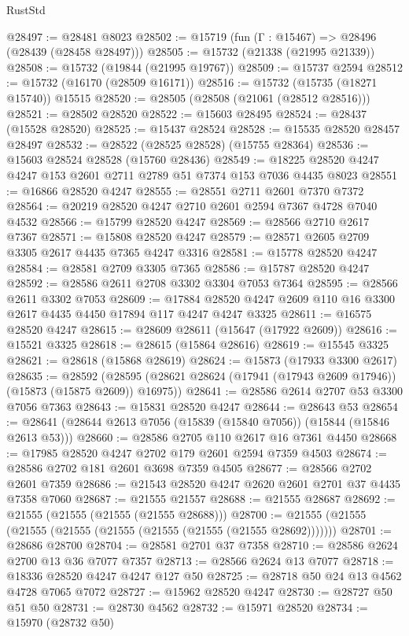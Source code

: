 \begin{lexlean}{RustStd}
\begin{coremodule}
@28497 := @28481 @8023
@28502 := @15719 (fun (Γ : @15467) => @28496 (@28439 (@28458 @28497)))
@28505 := @15732 (@21338 (@21995 @21339))
@28508 := @15732 (@19844 (@21995 @19767))
@28509 := @15737 @2594
@28512 := @15732 (@16170 (@28509 @16171))
@28516 := @15732 (@15735 (@18271 @15740)) @15515
@28520 := @28505 (@28508 (@21061 (@28512 @28516)))
@28521 := @28502 @28520
@28522 := @15603 @28495
@28524 := @28437 (@15528 @28520)
@28525 := @15437 @28524
@28528 := @15535 @28520 @28457 @28497
@28532 := @28522 (@28525 @28528) (@15755 @28364)
@28536 := @15603 @28524 @28528 (@15760 @28436)
@28549 := @18225 @28520 @4247 @4247 @153 @2601 @2711 @2789 @51 @7374 @153 @7036 @4435 @8023
@28551 := @16866 @28520 @4247
@28555 := @28551 @2711 @2601 @7370 @7372
@28564 := @20219 @28520 @4247 @2710 @2601 @2594 @7367 @4728 @7040 @4532
@28566 := @15799 @28520 @4247
@28569 := @28566 @2710 @2617 @7367
@28571 := @15808 @28520 @4247
@28579 := @28571 @2605 @2709 @3305 @2617 @4435 @7365 @4247 @3316
@28581 := @15778 @28520 @4247
@28584 := @28581 @2709 @3305 @7365
@28586 := @15787 @28520 @4247
@28592 := @28586 @2611 @2708 @3302 @3304 @7053 @7364
@28595 := @28566 @2611 @3302 @7053
@28609 := @17884 @28520 @4247 @2609 @110 @16 @3300 @2617 @4435 @4450 @17894 @117 @4247 @4247 @3325
@28611 := @16575 @28520 @4247
@28615 := @28609 @28611 (@15647 (@17922 @2609))
@28616 := @15521 @3325
@28618 := @28615 (@15864 @28616)
@28619 := @15545 @3325
@28621 := @28618 (@15868 @28619)
@28624 := @15873 (@17933 @3300 @2617)
@28635 := @28592
    (@28595 (@28621 @28624 (@17941 (@17943 @2609 @17946)) (@15873 (@15875 @2609)) @16975))
@28641 := @28586 @2614 @2707 @53 @3300 @7056 @7363
@28643 := @15831 @28520 @4247
@28644 := @28643 @53
@28654 := @28641 (@28644 @2613 @7056 (@15839 (@15840 @7056)) (@15844 (@15846 @2613 @53)))
@28660 := @28586 @2705 @110 @2617 @16 @7361 @4450
@28668 := @17985 @28520 @4247 @2702 @179 @2601 @2594 @7359 @4503
@28674 := @28586 @2702 @181 @2601 @3698 @7359 @4505
@28677 := @28566 @2702 @2601 @7359
@28686 := @21543 @28520 @4247 @2620 @2601 @2701 @37 @4435 @7358 @7060
@28687 := @21555 @21557
@28688 := @21555 @28687
@28692 := @21555 (@21555 (@21555 (@21555 @28688)))
@28700 := @21555 (@21555 (@21555 (@21555 (@21555 (@21555 (@21555 (@21555 @28692)))))))
@28701 := @28686 @28700
@28704 := @28581 @2701 @37 @7358
@28710 := @28586 @2624 @2700 @13 @36 @7077 @7357
@28713 := @28566 @2624 @13 @7077
@28718 := @18336 @28520 @4247 @4247 @127 @50
@28725 := @28718 @50 @24 @13 @4562 @4728 @7065 @7072
@28727 := @15962 @28520 @4247
@28730 := @28727 @50 @51 @50
@28731 := @28730 @4562
@28732 := @15971 @28520
@28734 := @15970 (@28732 @50)

\end{coremodule}
\end{lexlean}
